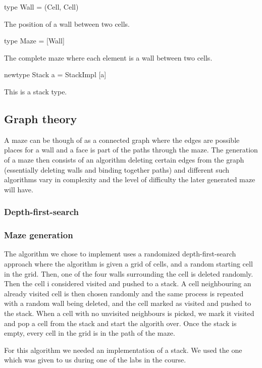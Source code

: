 \documentclass[12pt, a4paper]{article}
\begin{document}
\begin{code}
type Wall = (Cell, Cell)
\end{code}
The position of a wall between two cells.

\begin{code}
type Maze = [Wall]
\end{code}
The complete maze where each element is a wall between two cells.

\begin{code}
newtype Stack a = StackImpl [a]
\end{code}
This is a stack type.

\subsection{Graph theory}
A maze can be though of as a connected graph where the edges are possible places for a wall and a face is part of the paths through the maze. The generation of a maze then consists of an algorithm deleting certain edges from the graph (essentially deleting walls and binding together paths) and different such algorithms vary in complexity and the level of difficulty the later generated maze will have. 


\subsubsection{Depth-first-search}


\subsubsection{Maze generation}
The algorithm we chose to implement uses a randomized depth-first-search approach where the algorithm is given a grid of cells, and a random starting cell in the grid. Then, one of the four walls surrounding the cell is deleted randomly. Then the cell i considered visited and pushed to a stack. A cell neighbouring an already visited cell is then chosen randomly and the same process is repeated with a random wall being deleted, and the cell marked as visited and pushed to the stack. When a cell with no unvisited neighbours is picked, we mark it visited and pop a cell from the stack and start the algorith over. Once the stack is empty, every cell in the grid is in the path of the maze. 

For this algorithm we needed an implementation of a stack. We used the one which was given to us during one of the labs in the course. 
\end{document}
